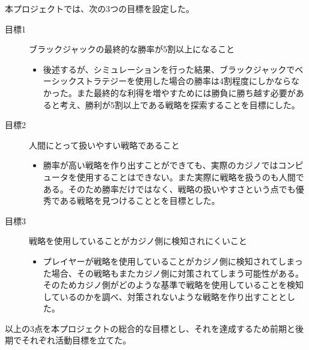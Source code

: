本プロジェクトでは、次の3つの目標を設定した。
\begin{description}
\item[目標1] ブラックジャックの最終的な勝率が5割以上になること
\begin{itemize}
\item{後述するが、シミュレーションを行った結果、ブラックジャックでベーシックストラテジーを使用した場合の勝率は4割程度にしかならなかった。また最終的な利得を増やすためには勝負に勝ち越す必要があると考え、勝利が5割以上である戦略を探索することを目標にした。}
\end{itemize}
\item[目標2] 人間にとって扱いやすい戦略であること
\begin{itemize}
\item{勝率が高い戦略を作り出すことができても、実際のカジノではコンピュータを使用することはできない。また実際に戦略を扱うのも人間である。そのため勝率だけではなく、戦略の扱いやすさという点でも優秀である戦略を見つけることとを目標とした。}
\end{itemize}
\item[目標3] 戦略を使用していることがカジノ側に検知されにくいこと
\begin{itemize}
\item{プレイヤーが戦略を使用していることがカジノ側に検知されてしまった場合、その戦略もまたカジノ側に対策されてしまう可能性がある。そのためカジノ側がどのような基準で戦略を使用していることを検知しているのかを調べ、対策されないような戦略を作り出すこととした。}
\end{itemize}
\end{description}
以上の3点を本プロジェクトの総合的な目標とし、それを達成するため前期と後期でそれぞれ活動目標を立てた。
